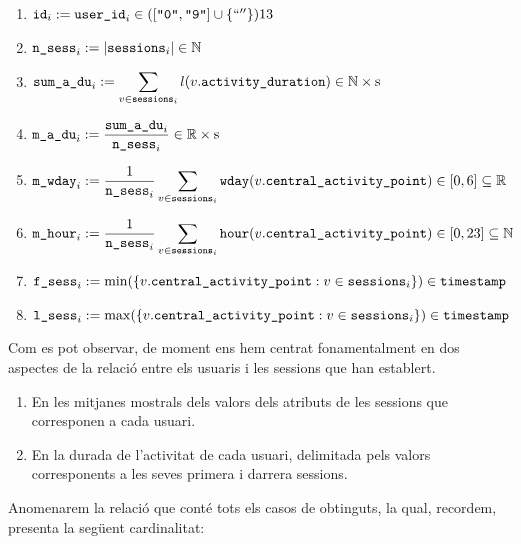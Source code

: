 \documentclass[
	a4paper,
	twoside,
	justified
]{tufte-book}
\begin{document}
\begin{fullwidth}
\begin{enumerate}[(1)]

\item $
\texttt{id}_i := \texttt{user\_id}_i \in  ([\texttt{``0''}, \texttt{``9''}] \cup \{`` ''\}){13}
$

\item $
\texttt{n\_sess}_i := 
	|\texttt{sessions}_i| \in \mathbb{N}
	$
	
\item 
$ \displaystyle
\texttt{sum\_a\_du}_i := 
	\sum_{v \in \texttt{sessions}_i} l(v.\texttt{activity\_duration}) \in \mathbb{N}\times \SI{}{\second}
$

\item $ \displaystyle
\texttt{m\_a\_du}_i := \frac{\texttt{sum\_a\_du}_i}{\texttt{n\_sess}_i} \in \mathbb{R} \times \SI{}{\second} 
$

\item $ 
\texttt{m\_wday}_i := 
\displaystyle
	\frac{
		1
	}{
		 \texttt{n\_sess}_i
	} 
	\displaystyle	\sum_{v \in \texttt{sessions}_i} 
				\texttt{wday}(v.\texttt{central\_activity\_point})
	\in [0,6] \subseteq \mathbb{R}$
			
\item $
	\texttt{m\_hour}_i := 
	\displaystyle
	\frac{1}{\texttt{n\_sess}_i}
	\displaystyle
	\sum_{v \in \texttt{sessions}_i} 
			\texttt{hour}(v.\texttt{central\_activity\_point})  \in [0,23] \subseteq \mathbb{N}$ 
			
\item $\texttt{f\_sess}_i := 
	\min(\{ v.\texttt{central\_activity\_point} : v \in \texttt{sessions}_i\}) \in \texttt{timestamp} $ 
	
\item $\texttt{l\_sess}_i := 
	\max(\{ v.\texttt{central\_activity\_point} : v \in \texttt{sessions}_i\}) \in \texttt{timestamp} $ 
			
\end{enumerate}
\end{fullwidth}

Com es pot observar, de moment ens hem centrat fonamentalment en dos aspectes de la relació entre els usuaris i les sessions que han establert.

\begin{enumerate}[(1)]

\item En les mitjanes mostrals dels valors dels atributs de les sessions que corresponen a cada usuari.

\item En la durada de l'activitat de cada usuari, delimitada pels valors  corresponents a les seves primera i darrera sessions.
 
\end{enumerate}
 Anomenarem  la relació que conté tots els casos de  obtinguts, la qual, recordem, presenta la següent cardinalitat:
\end{document}
